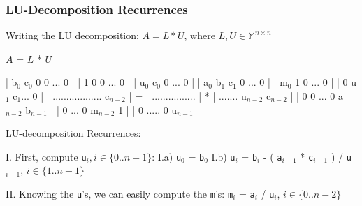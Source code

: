 \documentclass{beamer}
\newcommand{\mymath}[1]{$ #1 $}
\newcommand{\myindx}[1]{_{#1}}
\begin{document}
\begin{frame}[fragile,t]
  \frametitle{LU-Decomposition Recurrences}

\begin{block}{Writing the LU decomposition: $A = L * U$, where $L, U \in \mathbb{M}^{n\times n}$} 
\begin{colorcode}[fontsize=\scriptsize]
            \mymath{A}                =           \mymath{L}           *          \mymath{U}
 
 | b\mymath{\myindx{0}}  c\mymath{\myindx{0}}  0   0  ... 0    |   | 1   0  0 ...   0 |   | u\mymath{\myindx{0}}  c\mymath{\myindx{0}}  0 ... 0    |
 | a\mymath{\myindx{0}}  b\mymath{\myindx{1}}  c\mymath{\myindx{1}}  0  ... 0    |   | m\mymath{\myindx{0}}  1  0 ...   0 |   | 0   u\mymath{\myindx{1}}  c\mymath{\myindx{1}}... 0    |
 | .................. c\mymath{\myindx{n-2}} | = | ................ | * | ....... u\mymath{\myindx{n-2}} c\mymath{\myindx{n-2}} |
 | 0   0 ...  0  a\mymath{\myindx{n-2}} b\mymath{\myindx{n-1}} |   | 0 ...  0  m\mymath{\myindx{n-2}} 1 |   | 0 ..... 0    u\mymath{\myindx{n-1}} |
\end{colorcode}
\end{block}

\bigskip

\begin{block}{LU-decomposition Recurrences:} 
\begin{colorcode}[fontsize=\scriptsize]
I.  First, compute {\tt u}\mymath{\myindx{i}, i \in \{0 .. n-1\}}: 
        I.a) {\tt u}\mymath{\myindx{0}} = {\tt b}\mymath{\myindx{0}}
        I.b) {\tt u}\mymath{\myindx{i}} = {\tt b}\mymath{\myindx{i}} - ( {\tt a}\mymath{\myindx{i-1}} * {\tt c}\mymath{\myindx{i-1}} ) / {\tt u}\mymath{\myindx{i-1}},   \mymath{i \in \{1 .. n-1\}}

II. Knowing the {\tt u}'s, we can easily compute the {\tt m}'s:
             {\tt m}\mymath{\myindx{i}} = {\tt a}\mymath{\myindx{i}} / {\tt u}\mymath{\myindx{i}}, \mymath{i \in \{0 .. n-2\}}
\end{colorcode}
\end{block}


\end{frame}
\end{document}
